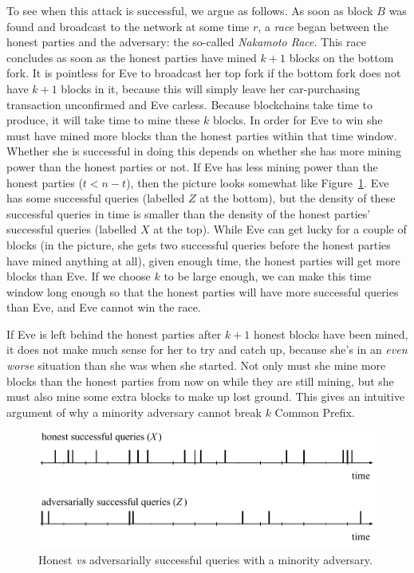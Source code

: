 To see when this attack is successful, we argue as follows. As soon as block $B$ was found and broadcast
to the network at some time $r$, a \emph{race} began between the honest parties and the adversary:
the so-called \emph{Nakamoto Race}.
This race concludes as soon as the honest parties have mined $k + 1$ blocks on the bottom fork.
It is pointless for Eve to broadcast her top fork if the bottom fork does not have $k + 1$ blocks
in it, because this will simply leave her car-purchasing transaction unconfirmed and Eve carless.
Because blockchains take time to produce, it will take time to mine these $k$ blocks. In order for
Eve to win she must have mined more blocks than the honest parties within that time window. Whether
she is successful in doing this depends on whether she has more mining power than the honest
parties or not. If Eve has less mining power than the honest parties ($t < n - t$), then the picture looks somewhat
like Figure~\ref{fig.x-vs-z}. Eve has some successful queries (labelled $Z$ at the bottom), but the density
of these successful queries in time is smaller than the density of the honest parties' successful
queries (labelled $X$ at the top). While Eve can get lucky for a couple of blocks (in the picture, she gets
two successful queries before the honest parties have mined anything at all), given enough time,
the honest parties will get more blocks than Eve. If we choose $k$ to be large enough, we can
make this time window long enough so that the honest parties will have more successful queries
than Eve, and Eve cannot win the race.

If Eve is left behind the honest parties after $k + 1$ honest blocks have been mined, it does not
make much sense for her to try and catch up, because she's in an \emph{even worse} situation than she was when
she started. Not only must she mine more blocks than the honest parties from now on while they are still
mining, but she must also mine some extra blocks to make up lost ground. This gives an intuitive
argument of why a minority adversary cannot break $k$ Common Prefix.

\begin{figure}[h]
    \centering
    \includegraphics[width=0.8 \columnwidth,keepaspectratio]{figures/x-vs-z.pdf}
    \caption{Honest \emph{vs} adversarially successful queries with a minority adversary.}
    \label{fig.x-vs-z}
\end{figure}

